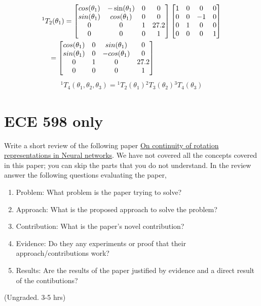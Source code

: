 \documentclass[twocolumn]{article}
\begin{document}
\begin{align}
  &{}^1T_2(\theta_1) =
    \begin{bmatrix}
      cos(\theta_1) & -\sin(\theta_1) & 0 & 0 \\
      sin(\theta_1) & cos(\theta_1) & 0 & 0 \\
      0 & 0 & 1 & 27.2 \\
      0 & 0 & 0 & 1
    \end{bmatrix}
                  \begin{bmatrix}
                    1 & 0 & 0 & 0 \\
                    0 & 0 & -1 & 0 \\
                    0 & 1 & 0 & 0 \\
                    0 & 0 & 0 & 1
                  \end{bmatrix}
                                \notag\\
  &\quad= \begin{bmatrix}
    cos(\theta_1) & 0 & sin(\theta_1) & 0 \\
    sin(\theta_1) & 0 & -cos(\theta_1) & 0 \\
    0 & 1 & 0 & 27.2 \\
    0 & 0 & 0 & 1
  \end{bmatrix}
\end{align}
\begin{align}
  {}^1T_4(\theta_1, \theta_2, \theta_3) = {}^1T_2(\theta_1) {}^2T_3(\theta_2) {}^3T_4(\theta_3)
\end{align}
\fi

\section{ECE 598 only}

Write a short review of the following paper
\href{https://openaccess.thecvf.com/content_CVPR_2019/html/Zhou_On_the_Continuity_of_Rotation_Representations_in_Neural_Networks_CVPR_2019_paper.html}{On
  continuity of rotation representations in Neural networks}. We have not
covered all the concepts covered in this paper; you can skip the parts that you
do not understand. In the review answer the following questions evaluating the paper,
\begin{enumerate}
\item Problem: What problem is the paper trying to solve?
\item Approach: What is the proposed approach to solve the problem?
\item Contribution: What is the paper's novel contribution?
\item Evidence: Do they any experiments or proof that their approach/contributions work?
\item Results: Are the results of the paper justified by evidence and a direct
  result of the contibutions?
\end{enumerate}
(Ungraded. 3-5 hrs)

%
%
\end{document}
